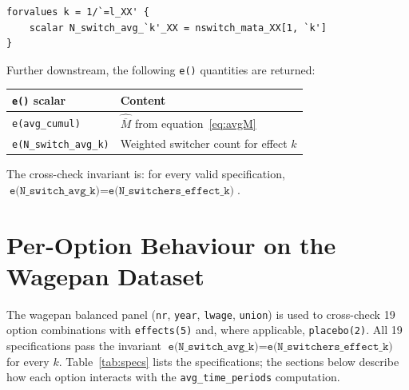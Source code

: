 \documentclass[11pt]{article}
\begin{document}
\begin{lstlisting}[language={}]
forvalues k = 1/`=l_XX' {
    scalar N_switch_avg_`k'_XX = nswitch_mata_XX[1, `k']
}
\end{lstlisting}

Further downstream, the following \texttt{e()} quantities are returned:

\begin{center}
\begin{tabular}{@{}ll@{}}
\toprule
\texttt{e()} scalar & Content \\
\midrule
\texttt{e(avg\_cumul)} & $\widehat{\overline{M}}$ from equation~\eqref{eq:avgM} \\
\texttt{e(N\_switch\_avg\_k)} & Weighted switcher count for effect $k$ \\
\bottomrule
\end{tabular}
\end{center}

The cross-check invariant is: for every valid specification,
$\texttt{e(N\_switch\_avg\_k)} = \texttt{e(N\_switchers\_effect\_k)}$.

\section{Per-Option Behaviour on the Wagepan Dataset}

The wagepan balanced panel (\texttt{nr}, \texttt{year}, \texttt{lwage},
\texttt{union}) is used to cross-check 19 option combinations with
\texttt{effects(5)} and, where applicable, \texttt{placebo(2)}.
All 19 specifications pass the invariant
$\texttt{e(N\_switch\_avg\_k)} = \texttt{e(N\_switchers\_effect\_k)}$
for every $k$.
Table~\ref{tab:specs} lists the specifications; the sections below describe how
each option interacts with the \texttt{avg\_time\_periods} computation.
\end{document}

